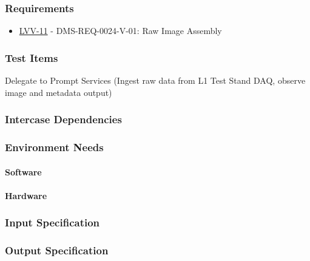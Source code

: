\subsubsection{Requirements}
\begin{itemize}
\item \href{https://jira.lsstcorp.org/browse/LVV-11}{LVV-11} - DMS-REQ-0024-V-01: Raw Image Assembly
\end{itemize}

\subsubsection{Test Items}
Delegate to Prompt Services (Ingest raw data from L1 Test Stand DAQ,
observe image and metadata output)



\subsubsection{Intercase Dependencies}

\subsubsection{Environment Needs}

\paragraph{Software}

\paragraph{Hardware}

\subsubsection{Input Specification}

\subsubsection{Output Specification}


